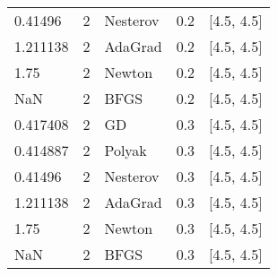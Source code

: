 \begin{tabular}{lllll}
  0.41496 &        2 & Nesterov &    0.2 &       [4.5, 4.5] \\
 1.211138 &        2 &  AdaGrad &    0.2 &       [4.5, 4.5] \\
     1.75 &        2 &   Newton &    0.2 &       [4.5, 4.5] \\
      NaN &        2 &     BFGS &    0.2 &       [4.5, 4.5] \\
 0.417408 &        2 &       GD &    0.3 &       [4.5, 4.5] \\
 0.414887 &        2 &   Polyak &    0.3 &       [4.5, 4.5] \\
  0.41496 &        2 & Nesterov &    0.3 &       [4.5, 4.5] \\
 1.211138 &        2 &  AdaGrad &    0.3 &       [4.5, 4.5] \\
     1.75 &        2 &   Newton &    0.3 &       [4.5, 4.5] \\
      NaN &        2 &     BFGS &    0.3 &       [4.5, 4.5] \\
\bottomrule
\end{tabular}
